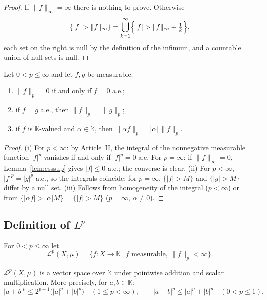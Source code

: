\documentclass[11pt]{article}
\newcommand{\K}{\mathbb{K}}
\newcommand{\norm}[1]{\lVert #1\rVert}
\begin{document}
\begin{proof}
If $\norm{f}_{\infty}=\infty$ there is nothing to prove. Otherwise
\[
\{|f|>\norm{f}_{\infty}\}=\bigcup_{k=1}^{\infty}\Bigl\{|f|>\norm{f}_{\infty}+\tfrac1k\Bigr\},
\]
each set on the right is null by the definition of the infimum, and a countable union of null sets is null.
\end{proof}

\begin{lemma}\label{lem:null}
Let $0<p\le\infty$ and let $f,g$ be measurable.
\begin{enumerate}
\item $\norm{f}_{p}=0$ if and only if $f=0$ a.e.;
\item if $f=g$ a.e., then $\norm{f}_{p}=\norm{g}_{p}$;
\item if $f$ is $\K$-valued and $\alpha\in\K$, then $\norm{\alpha f}_{p}=|\alpha|\,\norm{f}_{p}$.
\end{enumerate}
\end{lemma}

\begin{proof}
(i) For $p<\infty$: by Article~II, the integral of the nonnegative measurable function $|f|^{p}$ vanishes if and only if $|f|^{p}=0$ a.e. For $p=\infty$: if $\norm{f}_{\infty}=0$, Lemma~\ref{lem:esssup} gives $|f|\le0$ a.e.; the converse is clear. (ii) For $p<\infty$, $|f|^{p}=|g|^{p}$ a.e., so the integrals coincide; for $p=\infty$, $\{|f|>M\}$ and $\{|g|>M\}$ differ by a null set. (iii) Follows from homogeneity of the integral ($p<\infty$) or from $\{|\alpha f|>|\alpha|M\}=\{|f|>M\}$ ($p=\infty$, $\alpha\ne0$).
\end{proof}

\subsection{Definition of $L^{p}$}

\begin{definition}\label{def:calLp}
For $0<p\le\infty$ let
\[
\mathcal{L}^{p}(X,\mu)=\bigl\{f:X\to\K\ \big|\ f\text{ measurable},\ \norm{f}_{p}<\infty\bigr\}.
\]
\end{definition}

\begin{proposition}\label{prop:vector}
$\mathcal{L}^{p}(X,\mu)$ is a vector space over $\K$ under pointwise addition and scalar multiplication. More precisely, for $a,b\in\K$:
\[
|a+b|^{p}\le 2^{p-1}\bigl(|a|^{p}+|b|^{p}\bigr)\quad(1\le p<\infty),\qquad
|a+b|^{p}\le |a|^{p}+|b|^{p}\quad(0<p\le1).
\]
\end{proposition}
\end{document}
